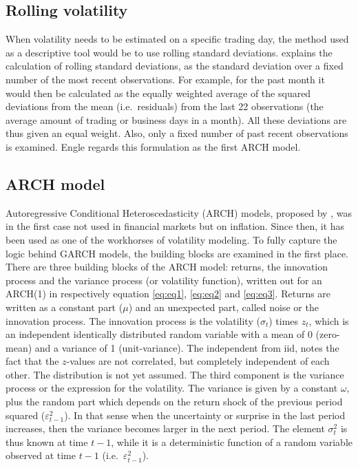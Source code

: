 \documentclass[a4paper, twoside]{templates/ociamthesis}
\begin{document}
\hypertarget{rolling-volatility}{%
\subsection{Rolling volatility}\label{rolling-volatility}}

\noindent When volatility needs to be estimated on a specific trading day, the method used as a descriptive tool would be to use rolling standard deviations. \textcite{engle2001} explains the calculation of rolling standard deviations, as the standard deviation over a fixed number of the most recent observations. For example, for the past month it would then be calculated as the equally weighted average of the squared deviations from the mean (i.e.~residuals) from the last 22 observations (the average amount of trading or business days in a month). All these deviations are thus given an equal weight. Also, only a fixed number of past recent observations is examined. Engle regards this formulation as the first ARCH model.

\hypertarget{arch-model}{%
\subsection{ARCH model}\label{arch-model}}

\noindent Autoregressive Conditional Heteroscedasticity (ARCH) models, proposed by \textcite{engle1982}, was in the first case not used in financial markets but on inflation. Since then, it has been used as one of the workhorses of volatility modeling. To fully capture the logic behind GARCH models, the building blocks are examined in the first place. There are three building blocks of the ARCH model: returns, the innovation process and the variance process (or volatility function), written out for an ARCH(1) in respectively equation \eqref{eq:eq1}, \eqref{eq:eq2} and \eqref{eq:eq3}. Returns are written as a constant part (\(\mu\)) and an unexpected part, called noise or the innovation process. The innovation process is the volatility (\(\sigma_t\)) times \(z_t\), which is an independent identically distributed random variable with a mean of 0 (zero-mean) and a variance of 1 (unit-variance). The independent from iid, notes the fact that the \(z\)-values are not correlated, but completely independent of each other. The distribution is not yet assumed. The third component is the variance process or the expression for the volatility. The variance is given by a constant \(\omega\), plus the random part which depends on the return shock of the previous period squared (\(\varepsilon_{t-1}^2\)). In that sense when the uncertainty or surprise in the last period increases, then the variance becomes larger in the next period. The element \(\sigma_t^2\) is thus known at time \(t-1\), while it is a deterministic function of a random variable observed at time \(t-1\) (i.e.~\(\varepsilon_{t-1}^2\)).
\end{document}
